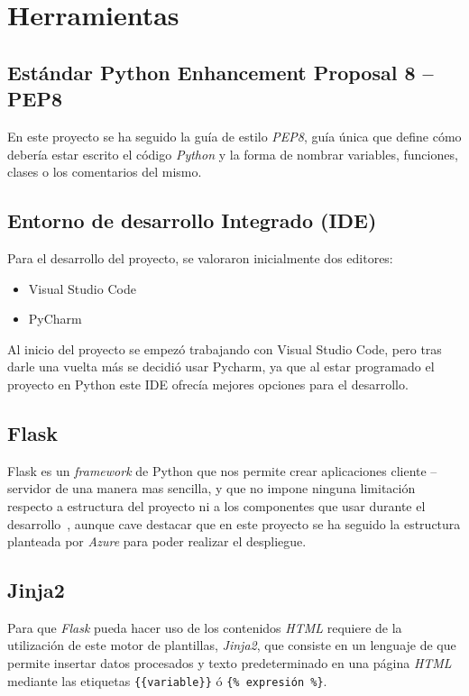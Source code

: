 \section{Herramientas}

\subsection{Estándar Python Enhancement Proposal 8 -- PEP8}
En este proyecto se ha seguido la guía de estilo \textit{PEP8}, guía única que define cómo debería estar escrito el código \textit{Python} y la forma de nombrar variables, funciones, clases o los comentarios del mismo.

\subsection{Entorno de desarrollo Integrado (IDE)}
Para el desarrollo del proyecto, se valoraron inicialmente dos editores:
\begin{itemize}
	\item Visual Studio Code
	\item PyCharm
\end{itemize}
Al inicio del proyecto se empezó trabajando con Visual Studio Code, pero tras darle una vuelta más se decidió usar Pycharm, ya que al estar programado el proyecto en Python este IDE ofrecía mejores opciones para el desarrollo.

\subsection{Flask}
Flask es un \textit{framework} de Python que nos permite crear aplicaciones cliente -- servidor de una manera mas sencilla, y que no impone ninguna limitación respecto a estructura del proyecto ni a los componentes que usar durante el desarrollo~\cite{grinberg2014flask}, aunque cave destacar que en este proyecto se ha seguido la estructura planteada por \textit{Azure} para poder realizar el despliegue.


\subsection{Jinja2}
Para que \textit{Flask} pueda hacer uso de los contenidos \textit{HTML} requiere de la utilización de este motor de plantillas, \textit{Jinja2}, que consiste en un lenguaje de que permite insertar datos procesados y texto predeterminado en una página \textit{HTML} mediante las etiquetas \verb|{{variable}}| ó \verb|{% expresión %}|.



